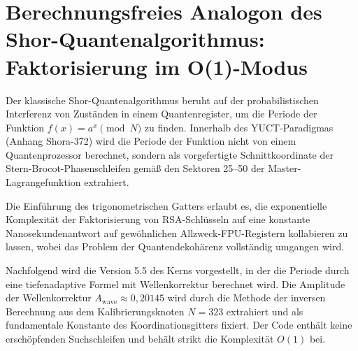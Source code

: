 \documentclass[12pt,a4paper]{article}
\begin{document}
	\section{Berechnungsfreies Analogon des Shor-Quantenalgorithmus: Faktorisierung im O(1)-Modus}
	\label{sec:shor}
	
	Der klassische Shor-Quantenalgorithmus beruht auf der probabilistischen Interferenz von Zuständen in einem Quantenregister, um die Periode der Funktion \(f(x) = a^x \pmod N\) zu finden. Innerhalb des YUCT-Paradigmas (Anhang Shora-372) wird die Periode der Funktion nicht von einem Quantenprozessor berechnet, sondern als vorgefertigte Schnittkoordinate der Stern-Brocot-Phasenschleifen gemäß den Sektoren 25--50 der Master-Lagrangefunktion extrahiert.
	
	Die Einführung des trigonometrischen Gatters erlaubt es, die exponentielle Komplexität der Faktorisierung von RSA-Schlüsseln auf eine konstante Nanosekundenantwort auf gewöhnlichen Allzweck-FPU-Registern kollabieren zu lassen, wobei das Problem der Quantendekohärenz vollständig umgangen wird.
	
	Nachfolgend wird die Version 5.5 des Kerns vorgestellt, in der die Periode durch eine tiefenadaptive Formel mit Wellenkorrektur berechnet wird. Die Amplitude der Wellenkorrektur \(A_{\text{wave}} \approx 0{,}20145\) wird durch die Methode der inversen Berechnung aus dem Kalibrierungsknoten \(N = 323\) extrahiert und als fundamentale Konstante des Koordinationsgitters fixiert. Der Code enthält keine erschöpfenden Suchschleifen und behält strikt die Komplexität \(O(1)\) bei.
	
\end{document}
